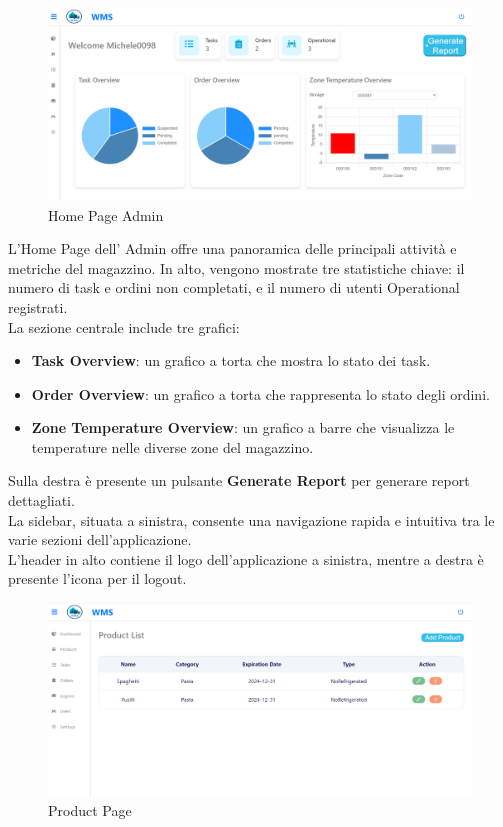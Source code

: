 \begin{figure}[H]
    \centering
    \includegraphics[width=\textwidth]{document/sections/img/Storyboard/homePageAdmin.png}
    \caption{Home Page Admin}
    \label{fig:homePageAdmins}
\end{figure}

L'Home Page dell' Admin offre una panoramica delle principali attività e metriche del magazzino.
In alto, vengono mostrate tre statistiche chiave: il numero di task e ordini non completati, e il numero di utenti
Operational registrati.\\

La sezione centrale include tre grafici:
\begin{itemize}
    \item \textbf{Task Overview}: un grafico a torta che mostra lo stato dei task.
    \item \textbf{Order Overview}: un grafico a torta che rappresenta lo stato degli ordini.
    \item \textbf{Zone Temperature Overview}: un grafico a barre che visualizza le temperature nelle diverse zone del magazzino.
\end{itemize}

Sulla destra è presente un pulsante \textbf{Generate Report} per generare report dettagliati.\\
La sidebar, situata a sinistra, consente una navigazione rapida e intuitiva tra le varie sezioni dell'applicazione.\\
L'header in alto contiene il logo dell'applicazione a sinistra, mentre a destra è presente l'icona per il logout.

\begin{figure}[H]
    \centering
    \includegraphics[width=\textwidth]{document/sections/img/Storyboard/productPage.png}
    \caption{Product Page}
    \label{fig:productPages}
\end{figure}

